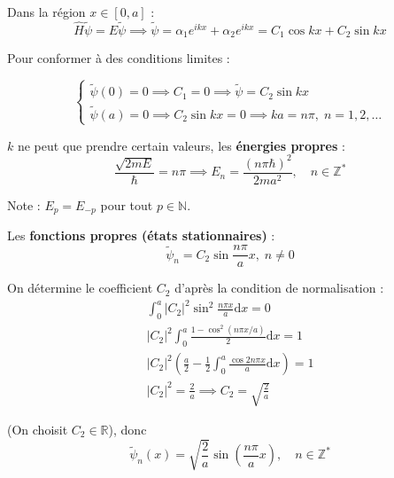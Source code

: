 
Dans la région $x \in [0,a]$ : 
\begin{equation}
  \hat{H} \widetilde \psi = E \widetilde \psi \implies \widetilde \psi = \alpha_1 e ^{ikx} + \alpha _2 e ^{ikx} = C_1 \cos kx + C_2 \sin kx
\end{equation}

Pour conformer à des conditions limites : 

\begin{equation}
  \begin{cases}
      \widetilde \psi (0) = 0 \implies C_1 = 0 \implies \widetilde \psi = C_2 \sin kx \\ 
      \widetilde \psi(a) = 0  \implies C_2 \sin kx = 0 \implies ka = n \pi , \; n = 1, 2, \dots
  \end{cases}
\end{equation}


$k$ ne peut que prendre certain valeurs, les \textbf{énergies propres} : 
\begin{equation}
  \frac{\sqrt{2mE}}{\hbar}  = n \pi \implies \boxed{E_n = \frac{(n \pi \hbar) ^{2}}{2 m a ^{2}} , \quad n \in \mathbb{Z} ^{*}}
\end{equation}

Note : $E _{p} = E _{-p}$ pour tout $p \in \mathbb{N}$.

Les \textbf{fonctions propres (états stationnaires)} : 
\begin{equation}
  \widetilde \psi _n = C_2 \sin \frac{n \pi }{a}   x, \; n \ne 0
\end{equation}

On détermine le coefficient $C_2$ d'après la condition de normalisation : 
\begin{gather}
  \int_{0}^{a} |C_2| ^{2} \sin ^{2} \frac{n \pi x}{a}  \mathrm{d} x = 0 \\ 
  |C _ 2 | ^{2} \int_{0}^{a} \frac{1- \cos ^{2} ( n \pi x / a )}{2}  \mathrm{d}x = 1 \\ 
  |C_2| ^{2} \left( \frac{a}{2}  - \frac{1}{2}  \int_{0}^{a} \frac{\cos 2n \pi x}{a}  \mathrm{d}x \right) = 1 \\
  |C_2 | ^{2} = \frac{2}{a}  \implies C_2 = \sqrt{\frac{2}{a} }
\end{gather}

(On choisit $C_2 \in \mathbb{R}$), donc 
\begin{equation}
  \boxed{\widetilde \psi_n (x) = \sqrt{\frac{2}{a}}  \sin \left( \frac{n \pi}{a} x \right), \quad n \in \mathbb{Z} ^{*}}
\end{equation}


